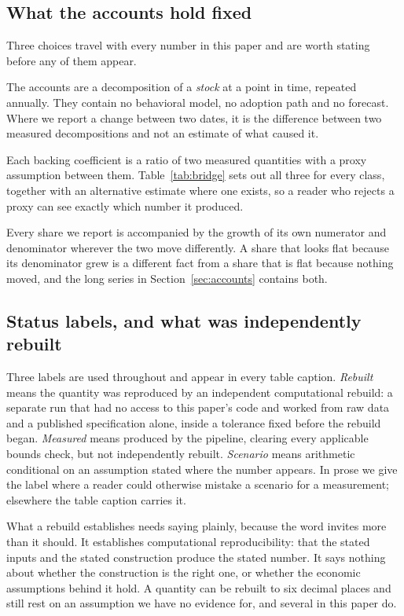 \subsection{What the accounts hold fixed}

Three choices travel with every number in this paper and are worth stating before any of them
appear.

The accounts are a decomposition of a \emph{stock} at a point in time, repeated annually. They
contain no behavioral model, no adoption path and no forecast. Where we report a change between
two dates, it is the difference between two measured decompositions and not an estimate of what
caused it.

Each backing coefficient is a ratio of two measured quantities with a proxy assumption between
them. Table~\ref{tab:bridge} sets out all three for every class, together with an alternative
estimate where one exists, so a reader who rejects a proxy can see exactly which number it
produced.

Every share we report is accompanied by the growth of its own numerator and denominator wherever
the two move differently. A share that looks flat because its denominator grew is a different
fact from a share that is flat because nothing moved, and the long series in
Section~\ref{sec:accounts} contains both.

\subsection{Status labels, and what was independently rebuilt}
\label{sec:rebuild}

Three labels are used throughout and appear in every table caption. \emph{Rebuilt} means the
quantity was reproduced by an independent computational rebuild: a separate run that had no
access to this paper's code and worked from raw data and a published specification alone, inside
a tolerance fixed before the rebuild began. \emph{Measured} means produced by the pipeline,
clearing every applicable bounds check, but not independently rebuilt. \emph{Scenario} means
arithmetic conditional on an assumption stated where the number appears. In prose we give the
label where a reader could otherwise mistake a scenario for a measurement; elsewhere the table
caption carries it.

What a rebuild establishes needs saying plainly, because the word invites more than it should. It
establishes computational reproducibility: that the stated inputs and the stated construction
produce the stated number. It says nothing about whether the construction is the right one, or
whether the economic assumptions behind it hold. A quantity can be rebuilt to six decimal places
and still rest on an assumption we have no evidence for, and several in this paper do.

